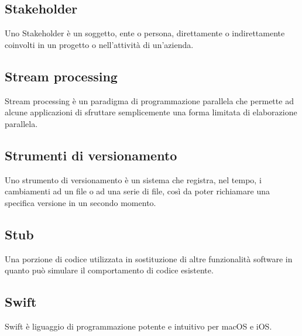 \subsection{Stakeholder}
Uno Stakeholder è un soggetto, ente o persona,  direttamente o indirettamente coinvolti in un progetto o nell'attività di un'azienda.


\subsection{Stream processing}
Stream processing è un paradigma di programmazione parallela che permette ad alcune applicazioni di sfruttare semplicemente una forma limitata di elaborazione parallela.

\subsection{Strumenti di versionamento}
Uno strumento di versionamento è un sistema che registra, nel tempo, i cambiamenti ad un file o ad una serie di file, così da poter richiamare una specifica versione in un secondo momento. 

\subsection{Stub}
Una porzione di codice utilizzata in sostituzione di altre funzionalità software in quanto può simulare il comportamento di codice esistente.

\subsection{Swift}
Swift è liguaggio di programmazione potente e intuitivo per macOS e iOS.

